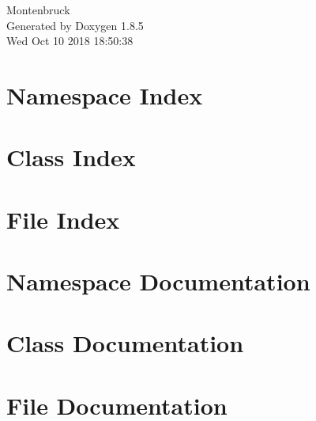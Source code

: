 \documentclass[twoside]{book}
\newcommand{\clearemptydoublepage}{%
  \newpage{\pagestyle{empty}\cleardoublepage}%
}
\begin{document}
\hypersetup{pageanchor=false}
\begin{titlepage}
\vspace*{7cm}
\begin{center}%
{\Large Montenbruck }\\
\vspace*{1cm}
{\large Generated by Doxygen 1.8.5}\\
\vspace*{0.5cm}
{\small Wed Oct 10 2018 18:50:38}\\
\end{center}
\end{titlepage}
\clearemptydoublepage
\tableofcontents
\clearemptydoublepage
{}
\hypersetup{pageanchor=true}

\chapter{Namespace Index}

\chapter{Class Index}

\chapter{File Index}

\chapter{Namespace Documentation}




\chapter{Class Documentation}
















\chapter{File Documentation}




















\newpage
{}
{}
\printindex
\end{document}
